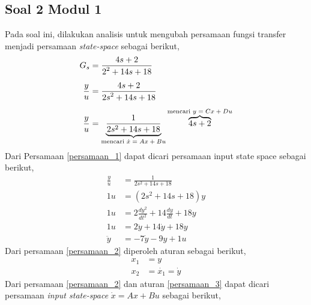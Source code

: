 \documentclass[../cover.tex]{subfiles}
\begin{document}
    \subsection{Soal 2 Modul 1}
    Pada soal ini, dilakukan analisis untuk mengubah persamaan fungsi transfer menjadi persamaan \textit{state-space} sebagai berikut,
        \begin{equation}
            \begin{split}
                G_s &= \frac{\displaystyle 4s+2}{\displaystyle 2^2+14s+18} \\[5pt]
                \frac{\displaystyle y}{\displaystyle u} &= \frac{\displaystyle 4s+2}{\displaystyle 2s^2+14s+18} \\[5pt]
                \frac{\displaystyle y}{\displaystyle u} &= \underbrace{\frac{1}{2s^2+14s+18}}_\text{mencari $\dot{x}=Ax+Bu$} \overbrace{4s+2}^\text{mencari $y=Cx+Du$}
                \label{persamaan_1}
            \end{split}
        \end{equation}
        Dari Persamaan \eqref{persamaan_1} dapat dicari persamaan input state space sebagai berikut,
        \begin{equation}
            \begin{split}
                \frac{y}{u} &= \frac{1}{2s^2+14s+18} \\[5pt]
                1u &= (2s^2+14s+18)y \\[5pt]
                1u &= 2\frac{dy^2}{dt^2} + 14\frac{dy}{dt} + 18y \\[5pt]
                1u &= 2\ddot{y} + 14\dot{y} + 18y \\[5pt]
                \ddot{y} &= -7\dot{y}-9y+1u
                \label{persamaan_2}
            \end{split}
        \end{equation}
        Dari persamaan \eqref{persamaan_2} diperoleh aturan sebagai berikut,
        \begin{equation}
            \begin{split}
                x_1 &= y \\[5pt]
                x_2 &= \dot{x_1} = \dot{y}
                \label{persamaan_3}
            \end{split}
        \end{equation}
        Dari persamaan \eqref{persamaan_2} dan aturan \eqref{persamaan_3} dapat dicari persamaan \textit{input state-space} $\dot{x}=Ax+Bu$ sebagai berikut,
\end{document}

